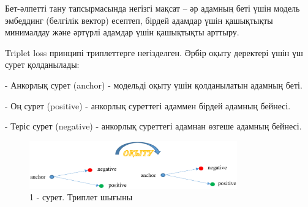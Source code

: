 \begin{multicols}{2}
Бет-әлпетті тану тапсырмасында негізгі мақсат -- әр адамның беті үшін
модель эмбеддинг (белгілік вектор) есептеп, бірдей адамдар үшін
қашықтықты минималдау және әртүрлі адамдар үшін қашықтықты арттыру.

Triplet loss принципі триплеттерге негізделген. Әрбір оқыту деректері
үшін үш сурет қолданылады:

- Анкорлық сурет (anchor) - модельді оқыту үшін қолданылатын адамның
беті.

- Оң сурет (positive) - анкорлық суреттегі адаммен бірдей адамның
бейнесі.

- Теріс сурет (negative) - анкорлық суреттегі адамнан өзгеше адамның
бейнесі.
\end{multicols}

\begin{figure}[H]
	\centering
	\includegraphics[width=0.8\textwidth]{media/ict4/image5}
	\caption*{1 - сурет. Триплет шығыны}
\end{figure}

